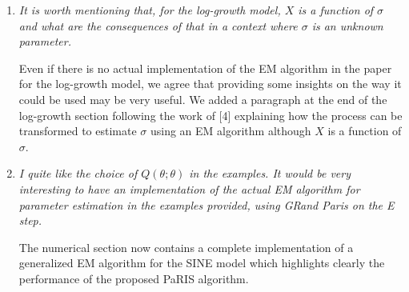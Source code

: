 \documentclass[12pt]{article}
\newcommand{\1}{\mathrm{1}}
\begin{document}
\begin{enumerate}
\item {\em It is worth mentioning that, for the log-growth model, $X$ is a function of $\sigma$ and what
are the consequences of that in a context where $\sigma$ is an unknown parameter.}

\vspace{.3cm}

Even if there is no actual implementation of the EM algorithm in the paper for the log-growth model, we agree that providing some insights on the way it could be used may be very useful. We added a paragraph at the end of the log-growth section following the work of [4] explaining how the process can be transformed to estimate $\sigma$ using an EM algorithm although $X$ is a function of $\sigma$.

\item {\em I quite like the choice of $Q(\theta;\theta)$ in the examples. It would be very interesting to
have an implementation of the actual EM algorithm for parameter estimation in the
examples provided, using GRand Paris on the E step.}

\vspace{.3cm}

The numerical section now contains a complete implementation of a generalized EM algorithm for the SINE model which highlights clearly the performance of the proposed PaRIS algorithm.  
\end{enumerate}
\end{document}
